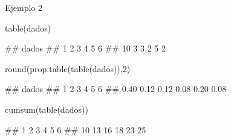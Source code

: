 \documentclass[
  ignorenonframetext,
  aspectratio=169]{beamer}
\newenvironment{Shaded}{\begin{snugshade}}{\end{snugshade}}
\newcommand{\DecValTok}[1]{\textcolor[rgb]{0.00,0.00,0.81}{#1}}
\newcommand{\FunctionTok}[1]{\textcolor[rgb]{0.00,0.00,0.00}{#1}}
\newcommand{\NormalTok}[1]{#1}
\let\oldverbatim\verbatim
\let\endoldverbatim\endverbatim
\renewenvironment{verbatim}{\tiny\oldverbatim}{\endoldverbatim}
\begin{document}
\begin{frame}[fragile]{Ejemplo 2}
\protect\hypertarget{ejemplo-2-3}{}
\begin{Shaded}
\begin{Highlighting}[]
\FunctionTok{table}\NormalTok{(dados)}
\end{Highlighting}
\end{Shaded}

\begin{verbatim}
## dados
##  1  2  3  4  5  6 
## 10  3  3  2  5  2
\end{verbatim}

\begin{Shaded}
\begin{Highlighting}[]
\FunctionTok{round}\NormalTok{(}\FunctionTok{prop.table}\NormalTok{(}\FunctionTok{table}\NormalTok{(dados)),}\DecValTok{2}\NormalTok{)}
\end{Highlighting}
\end{Shaded}

\begin{verbatim}
## dados
##    1    2    3    4    5    6 
## 0.40 0.12 0.12 0.08 0.20 0.08
\end{verbatim}

\begin{Shaded}
\begin{Highlighting}[]
\FunctionTok{cumsum}\NormalTok{(}\FunctionTok{table}\NormalTok{(dados))}
\end{Highlighting}
\end{Shaded}

\begin{verbatim}
##  1  2  3  4  5  6 
## 10 13 16 18 23 25
\end{verbatim}
\end{frame}
\end{document}
